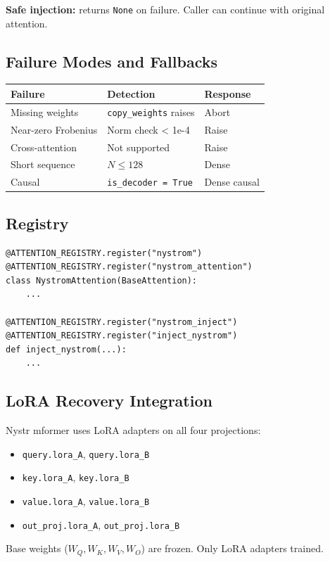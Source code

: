 \textbf{Safe injection:} returns \texttt{None} on failure. Caller can continue with 
original attention.

\subsection{Failure Modes and Fallbacks}

\begin{table}[H]
\centering
\small
\begin{tabular}{lll}
\toprule
\textbf{Failure} & \textbf{Detection} & \textbf{Response} \\
\midrule
Missing weights & \texttt{copy\_weights} raises & Abort \\
Near-zero Frobenius & Norm check < 1e-4 & Raise \\
Cross-attention & Not supported & Raise \\
Short sequence & $N \leq 128$ & Dense \\
Causal & \texttt{is\_decoder = True} & Dense causal \\
\bottomrule
\end{tabular}
\end{table}

\subsection{Registry}

\begin{lstlisting}
@ATTENTION_REGISTRY.register("nystrom")
@ATTENTION_REGISTRY.register("nystrom_attention")
class NystromAttention(BaseAttention):
    ...

@ATTENTION_REGISTRY.register("nystrom_inject")
@ATTENTION_REGISTRY.register("inject_nystrom")
def inject_nystrom(...):
    ...
\end{lstlisting}

\subsection{LoRA Recovery Integration}

Nystr mformer uses LoRA adapters on all four projections:

\begin{itemize}
\item \texttt{query.lora\_A}, \texttt{query.lora\_B}
\item \texttt{key.lora\_A}, \texttt{key.lora\_B}
\item \texttt{value.lora\_A}, \texttt{value.lora\_B}
\item \texttt{out\_proj.lora\_A}, \texttt{out\_proj.lora\_B}

\end{itemize}
Base weights ($W_Q, W_K, W_V, W_O$) are frozen. Only LoRA adapters trained.

